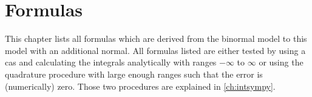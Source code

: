 \chapter{Formulas}\label{ch:formulas}

This chapter lists all formulas which are derived from the binormal model to this model with an additional normal.
All formulas listed are either tested by using a \gls{cas}
and calculating the integrals analytically with ranges $-\infty$ to $\infty$ or
using the quadrature procedure with large enough ranges such that the error is (numerically) zero.
Those two procedures are explained in \cref{ch:intsympy}.















